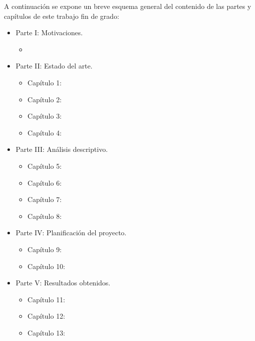 A continuación se expone un breve esquema general del contenido de las partes y capítulos de este trabajo fin de grado:

\begin{itemize}
\item Parte I: Motivaciones.
\begin{itemize}
\item
\end{itemize}
\item Parte II: Estado del arte.
\begin{itemize}
\item Capítulo 1:
\item Capítulo 2:
\item Capítulo 3:
\item Capítulo 4:
\end{itemize}
\item Parte III: Análisis descriptivo.
\begin{itemize}
\item Capítulo 5:
\item Capítulo 6:
\item Capítulo 7:
\item Capítulo 8:
\end{itemize}
\item Parte IV: Planificación del proyecto.
\begin{itemize}
\item Capítulo 9:
\item Capítulo 10:
\end{itemize}
\item Parte V: Resultados obtenidos.
\begin{itemize}
\item Capítulo 11:
\item Capítulo 12:
\item Capítulo 13:
\end{itemize}
\end{itemize}